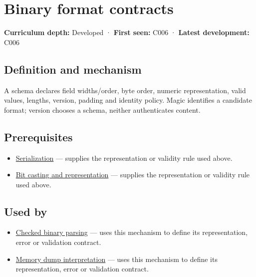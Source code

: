 \hypertarget{appendix-590bbb2424c1}{}\label{referencestart:appendix-590bbb2424c1}
\section{Binary format contracts}\label{appendix-590bbb2424c1-binary-format-contracts}

\textbf{Curriculum depth:} Developed · \textbf{First seen:} C006 · \textbf{Latest development:} C006

\begin{allmightroledefinition}

\subsection{Definition and mechanism}\label{appendix-590bbb2424c1-definition-and-mechanism}

A schema declares field widths/order, byte order, numeric representation, valid values, lengths, version, padding and identity policy. Magic identifies a candidate format; version chooses a schema, neither authenticates content.

\end{allmightroledefinition}

\subsection{Prerequisites}\label{appendix-590bbb2424c1-prerequisites}

\begin{itemize}
\tightlist
\item
  \hyperref[appendix-91d09ebed979]{Serialization} --- supplies the representation or validity rule used above.
\item
  \hyperref[appendix-34ee45f161c1]{Bit casting and representation} --- supplies the representation or validity rule used above.
\end{itemize}

\subsection{Used by}\label{appendix-590bbb2424c1-used-by}

\begin{itemize}
\tightlist
\item
  \hyperref[appendix-652d81568de9]{Checked binary parsing} --- uses this mechanism to define its representation, error or validation contract.
\item
  \hyperref[appendix-230b59c0676b]{Memory dump interpretation} --- uses this mechanism to define its representation, error or validation contract.
\end{itemize}

